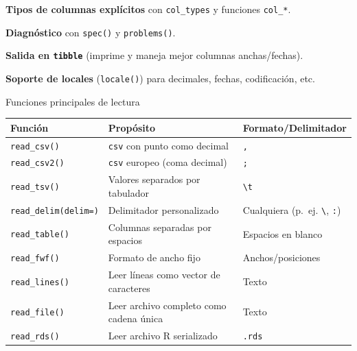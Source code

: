 \documentclass[
]{book}
\begin{document}
\textbf{Tipos de columnas explícitos} con \texttt{col\_types} y funciones \texttt{col\_*}.

\textbf{Diagnóstico} con \texttt{spec()} y \texttt{problems()}.

\textbf{Salida en \texttt{tibble}} (imprime y maneja mejor columnas anchas/fechas).

\textbf{Soporte de locales} (\texttt{locale()}) para decimales, fechas, codificación, etc.

{} Funciones principales de lectura

\begin{longtable}[]{@{}
  >{\raggedright\arraybackslash}p{}
  >{\raggedright\arraybackslash}p{}
  >{\raggedright\arraybackslash}p{}@{}}
\toprule\noalign{}
\begin{minipage}[b]{\linewidth}\raggedright
Función
\end{minipage} & \begin{minipage}[b]{\linewidth}\raggedright
Propósito
\end{minipage} & \begin{minipage}[b]{\linewidth}\raggedright
Formato/Delimitador
\end{minipage} \\
\midrule\noalign{}
\endhead
\bottomrule\noalign{}
\endlastfoot
\texttt{read\_csv()} & \texttt{csv} con punto como decimal & \texttt{,} \\
\texttt{read\_csv2()} & \texttt{csv} europeo (coma decimal) & \texttt{;} \\
\texttt{read\_tsv()} & Valores separados por tabulador & \texttt{\textbackslash{}t} \\
\texttt{read\_delim(delim=)} & Delimitador personalizado & Cualquiera (p.~ej. \texttt{\textbackslash{}\textbar{}}, \texttt{:}) \\
\texttt{read\_table()} & Columnas separadas por espacios & Espacios en blanco \\
\texttt{read\_fwf()} & Formato de ancho fijo & Anchos/posiciones \\
\texttt{read\_lines()} & Leer líneas como vector de caracteres & Texto \\
\texttt{read\_file()} & Leer archivo completo como cadena única & Texto \\
\texttt{read\_rds()} & Leer archivo R serializado & \texttt{.rds} \\
\end{longtable}
\end{document}

